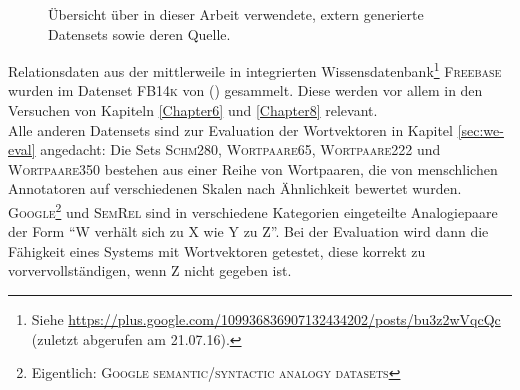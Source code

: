   \begin{figure}[h]
    \centering
    \def\arraystretch{1.5}
  \caption[Übersicht über verwendete vorgefertigte Datensets]{Übersicht über in dieser Arbeit verwendete, extern generierte
  Datensets sowie deren Quelle.\label{fig:datasets}}
  \end{figure}

  Relationsdaten aus der mittlerweile in  integrierten Wissensdatenbank\footnote{Siehe
  \url{https://plus.google.com/109936836907132434202/posts/bu3z2wVqcQc} (zuletzt abgerufen am 21.07.16).}
   \textsc{Freebase} wurden im Datenset \textsc{FB14k} von (\cite{bordes2013translating}) gesammelt.
  Diese werden vor allem in den Versuchen von Kapiteln \ref{Chapter6} und \ref{Chapter8} relevant.\\
  Alle anderen Datensets sind zur Evaluation der Wortvektoren in Kapitel \ref{sec:we-eval} angedacht: Die Sets
  \textsc{Schm280}, \textsc{Wortpaare65}, \textsc{Wortpaare222} und \textsc{Wortpaare350} bestehen aus einer Reihe
  von Wortpaaren, die von menschlichen Annotatoren auf verschiedenen Skalen nach Ähnlichkeit bewertet wurden.\\
  \textsc{Google}\footnote{Eigentlich: \textsc{Google semantic/syntactic analogy datasets}} und \textsc{SemRel} sind
  in verschiedene Kategorien eingeteilte Analogiepaare der Form ``W verhält sich zu X wie Y zu Z''. Bei der Evaluation
  wird dann die Fähigkeit eines Systems mit Wortvektoren getestet, diese korrekt zu vorvervollständigen, wenn Z nicht
  gegeben ist.


